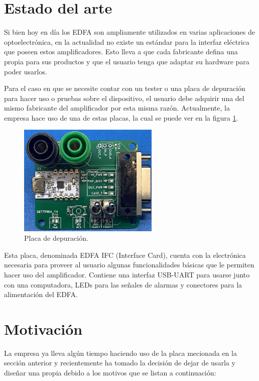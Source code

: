 \section{Estado del arte}

Si bien hoy en día los EDFA son ampliamente utilizados en varias aplicaciones de optoelectrónica, en la actualidad no existe un estándar para la interfaz eléctrica que poseen estos amplificadores. Esto lleva a que cada fabricante defina una propia para sus productos y que el usuario tenga que adaptar su hardware para poder usarlos.

Para el caso en que se necesite contar con un tester o una placa de depuración para hacer uso o pruebas sobre el dispositivo, el usuario debe adquirir una del mismo fabricante del amplificador por esta misma razón. Actualmente, la empresa hace uso de una de estas placas, la cual se puede ver en la figura \ref{fig:placaDebug}.

\begin{figure}[H]
\centering
\includegraphics[width=0.60\textwidth]{./Figures/placaDebug.jpg}
\caption{Placa de depuración.}
\label{fig:placaDebug}
\end{figure}

Esta placa, denominada EDFA IFC (Interface Card), cuenta con la electrónica necesaria para proveer al usuario algunas funcionalidades básicas que le permiten hacer uso del amplificador. Contiene una interfaz USB-UART para usarse junto con una computadora, LEDs para las señales de alarmas y conectores para la alimentación del EDFA.

\section{Motivación}

La empresa ya lleva algún tiempo haciendo uso de la placa mecionada en la sección anterior y recientemente ha tomado la decisión de dejar de usarla y diseñar una propia debido a los motivos que se listan a continuación:

